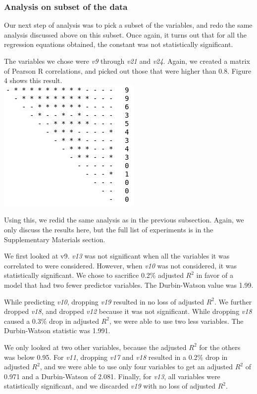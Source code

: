 \documentclass[12pt,a4paper,twocolumn]{article}
\begin{document}
\subsubsection{Analysis on subset of the data}
Our next step of analysis was to pick a subset of the variables, and redo the same analysis discussed above on this subset. Once again, it turns out that for all the regression equations obtained, the constant was not statistically significant.

The variables we chose were \textit{v9} through \textit{v21} and \textit{v24}. Again, we created a matrix of Pearson R correlations, and picked out those that were higher than 0.8. Figure 4 shows this result. \\

\includegraphics[scale=0.6]{fig4.png}
\begingroup
{}
\endgroup
\hfill\break

Using this, we redid the same analysis as in the previous subsection. Again, we only discuss the results here, but the full list of experiments is in the Supplementary Materials section.

We first looked at v9. \textit{v13} was not significant when all the variables it was correlated to were considered. However, when \textit{v10} was not considered, it was statistically significant. We chose to sacrifice 0.2\% adjusted $R^2$ in favor of a model that had two fewer predictor variables. The Durbin-Watson value was 1.99.

While predicting \textit{v10}, dropping \textit{v19} resulted in no loss of adjusted $R^2$. We further dropped \textit{v18}, and dropped \textit{v12} because it was not significant. While dropping \textit{v18} caused a 0.3\% drop in adjusted $R^2$, we were able to use two less variables. The Durbin-Watson statistic was 1.991.

We only looked at two other variables, because the adjusted $R^2$ for the others was below 0.95. For \textit{v11}, dropping \textit{v17} and \textit{v18} resulted in a 0.2\% drop in adjusted $R^2$, and we were able to use only four variables to get an adjusted $R^2$ of 0.971 and a Durbin-Watson of 2.081. Finally, for \textit{v13}, all variables were statistically significant, and we discarded \textit{v19} with no loss of adjusted $R^2$.
\end{document}
